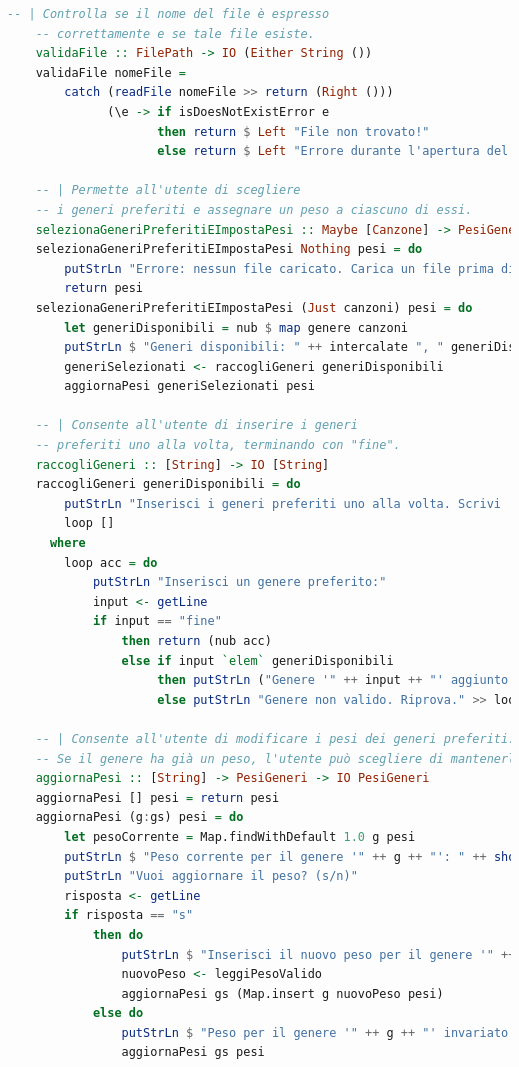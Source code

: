 \documentclass[a4paper,11pt]{article}
\begin{document}
\begin{lstlisting}[language=Haskell,caption=raccomandazioni.hs]
    -- | Controlla se il nome del file è espresso
    -- correttamente e se tale file esiste.
    validaFile :: FilePath -> IO (Either String ())
    validaFile nomeFile =
        catch (readFile nomeFile >> return (Right ()))
              (\e -> if isDoesNotExistError e
                     then return $ Left "File non trovato!"
                     else return $ Left "Errore durante l'apertura del file.")
    
    -- | Permette all'utente di scegliere
    -- i generi preferiti e assegnare un peso a ciascuno di essi.
    selezionaGeneriPreferitiEImpostaPesi :: Maybe [Canzone] -> PesiGeneri -> IO PesiGeneri
    selezionaGeneriPreferitiEImpostaPesi Nothing pesi = do
        putStrLn "Errore: nessun file caricato. Carica un file prima di continuare."
        return pesi
    selezionaGeneriPreferitiEImpostaPesi (Just canzoni) pesi = do
        let generiDisponibili = nub $ map genere canzoni
        putStrLn $ "Generi disponibili: " ++ intercalate ", " generiDisponibili
        generiSelezionati <- raccogliGeneri generiDisponibili
        aggiornaPesi generiSelezionati pesi
    
    -- | Consente all'utente di inserire i generi
    -- preferiti uno alla volta, terminando con "fine".
    raccogliGeneri :: [String] -> IO [String]
    raccogliGeneri generiDisponibili = do
        putStrLn "Inserisci i generi preferiti uno alla volta. Scrivi 'fine' per terminare."
        loop []
      where
        loop acc = do
            putStrLn "Inserisci un genere preferito:"
            input <- getLine
            if input == "fine"
                then return (nub acc)
                else if input `elem` generiDisponibili
                     then putStrLn ("Genere '" ++ input ++ "' aggiunto ai preferiti.") >> loop (input : acc)
                     else putStrLn "Genere non valido. Riprova." >> loop acc
    
    -- | Consente all'utente di modificare i pesi dei generi preferiti.
    -- Se il genere ha già un peso, l'utente può scegliere di mantenerlo o aggiornarlo.
    aggiornaPesi :: [String] -> PesiGeneri -> IO PesiGeneri
    aggiornaPesi [] pesi = return pesi
    aggiornaPesi (g:gs) pesi = do
        let pesoCorrente = Map.findWithDefault 1.0 g pesi
        putStrLn $ "Peso corrente per il genere '" ++ g ++ "': " ++ show pesoCorrente
        putStrLn "Vuoi aggiornare il peso? (s/n)"
        risposta <- getLine
        if risposta == "s"
            then do
                putStrLn $ "Inserisci il nuovo peso per il genere '" ++ g ++ "':"
                nuovoPeso <- leggiPesoValido
                aggiornaPesi gs (Map.insert g nuovoPeso pesi)
            else do
                putStrLn $ "Peso per il genere '" ++ g ++ "' invariato."
                aggiornaPesi gs pesi
    

\end{lstlisting}
\end{document}
